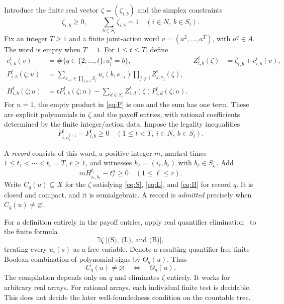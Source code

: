 \documentclass[11pt,a4paper]{article}
\theoremstyle{definition}
\begin{document}
Introduce the finite real vector $\zeta=(\zeta_{i,b})$ and the simplex
constraints
\begin{equation}\tag{S}\label{eq:S}
 \zeta_{i,b}\ge0,\qquad \sum_{b\in S_i}\zeta_{i,b}=1
 \quad(i\in N,\ b\in S_i).
\end{equation}
Fix an integer $T\ge1$ and a finite joint-action word
$v=(a^2,\ldots,a^T)$, with $a^q\in A$. The word is empty when $T=1$.
For $1\le t\le T$, define
\begin{align}
 c_{i,b}^t(v)&=\#\{q\in\{2,\ldots,t\}:a_i^q=b\},
 &Z_{i,b}^t(\zeta)&=\zeta_{i,b}+c_{i,b}^t(v),\label{eq:counts}\\
 P_{i,b}^t(\zeta;u)&=
 \sum_{s_{-i}\in\prod_{j\ne i}S_j}
 u_i(b,s_{-i})\prod_{j\ne i}Z_{j,s_j}^t(\zeta),\label{eq:P}\\
 H_{i,b}^t(\zeta;u)&=
 tP_{i,b}^t(\zeta;u)
 -\sum_{d\in S_i}Z_{i,d}^t(\zeta)P_{i,d}^t(\zeta;u).
 \label{eq:H}
\end{align}
For $n=1$, the empty product in \eqref{eq:P} is one and the sum has one
term. These are explicit polynomials in $\zeta$ and the payoff entries,
with rational coefficients determined by the finite integer/action data.
Impose the legality inequalities
\begin{equation}\tag{L}\label{eq:L}
 P_{i,a_i^{t+1}}^t-P_{i,b}^t\ge0
 \quad(1\le t<T,\ i\in N,\ b\in S_i).
\end{equation}

A \emph{record} consists of this word, a positive integer $m$, marked
times $1\le t_1<\cdots<t_r=T$, $r\ge1$, and witnesses
$h_\ell=(i_\ell,b_\ell)$ with $b_\ell\in S_{i_\ell}$. Add
\begin{equation}\tag{B}\label{eq:B}
 mH_{i_\ell,b_\ell}^{t_\ell}-t_\ell^n\ge0
 \quad(1\le\ell\le r).
\end{equation}
Write $C_q(u)\subseteq X$ for the $\zeta$ satisfying
\eqref{eq:S}, \eqref{eq:L}, and \eqref{eq:B} for record $q$.
It is closed and compact, and it is semialgebraic. A record is
\emph{admitted} precisely when $C_q(u)\ne\varnothing$.

For a definition entirely in the payoff entries, apply real quantifier
elimination~\cite{tarski} to the finite formula
\begin{equation}\label{eq:QE}
 \exists\zeta\;\bigl[%
\text{(S), (L), and (B)}
 \bigr],
\end{equation}
treating every $u_i(s)$ as a free variable. Denote a resulting
quantifier-free finite Boolean combination of polynomial signs by
$\Theta_q(u)$. Thus
\begin{equation}\label{eq:admission}
 C_q(u)\ne\varnothing\quad\Longleftrightarrow\quad\Theta_q(u).
\end{equation}
The compilation depends only on $q$ and eliminates $\zeta$ entirely.
It works for arbitrary real arrays. For rational arrays, each individual
finite test is decidable. This does not decide the later well-foundedness
condition on the countable tree.
\end{document}
